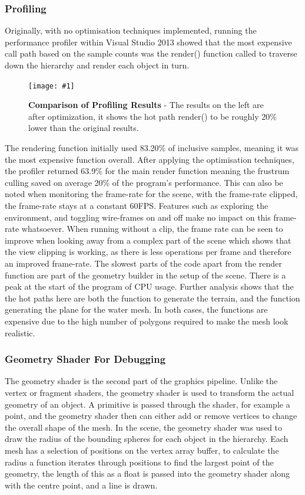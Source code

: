 \documentclass[conference]{acmsiggraph}
\newcommand{\figuremacroW}[4]{
\begin{figure}[h] %
	\centering
	\texttt{[image: \#1]}
	\caption[#2]{\textbf{#2} - #3}
	\label{fig:#1}
\end{figure}
}
\begin{document}
\subsubsection{Profiling}
Originally, with no optimisation techniques implemented, running the performance profiler within Visual Studio 2013 showed that the most expensive call path based on the sample counts was the render() function called to traverse down the hierarchy and render each object in turn.
	
\figuremacroW	
{compare}
{Comparison of Profiling Results}
{The results on the left are after optimization, it shows the hot path render() to be roughly 20\% lower than the original results.}
{1.0}
	
The rendering function initially used 83.20\% of inclusive samples, meaning it was the most expensive function overall. After applying the optimisation techniques, the profiler returned 63.9\% for the main render function meaning the frustrum culling saved on average 20\% of the program's performance. This can also be noted when monitoring the frame-rate for the scene, with the frame-rate clipped, the frame-rate stays at a constant 60FPS. Features such as exploring the environment, and toggling wire-frames on and off make no impact on this frame-rate whatsoever. When running without a clip, the frame rate can be seen to improve when looking away from a complex part of the scene which shows that the view clipping is working, as there is less operations per frame and therefore an improved frame-rate. The slowest parts of the code apart from the render function are part of the geometry builder in the setup of the scene. There is a peak at the start of the program of CPU usage. Further analysis shows that the the hot paths here are both the function to generate the terrain, and the function generating the plane for the water mesh. In both cases, the functions are expensive due to the high number of polygons required to make the mesh look realistic. 
	
	
\subsubsection{Geometry Shader For Debugging}
The geometry shader is the second part of the graphics pipeline. Unlike the vertex or fragment shaders, the geometry shader is used to transform the actual geometry of an object. A primitive is passed through the shader, for example a point, and the geometry shader then can either add or remove vertices to change the overall shape of the mesh. In the scene, the geometry shader was used to draw the radius of the bounding spheres for each object in the hierarchy. Each mesh has a selection of positions on the vertex array buffer, to calculate the radius a function iterates through positions to find the largest point of the geometry, the length of this as a float is passed into the geometry shader along with the centre point, and a line is drawn.
\end{document}
